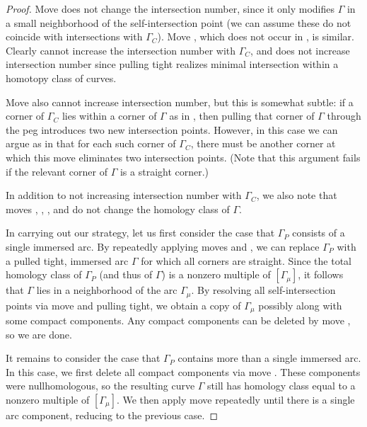 \documentclass[11pt]{amsart}
\numberwithin{equation}{section}
\numberwithin{theorem}{section}
\theoremstyle{definition}
\begin{document}
\begin{proof}
Move  does not change the intersection number, since it only modifies $\Gamma$ in a small neighborhood of the self-intersection point (we can assume these do not coincide with intersections with $\Gamma_C$). Move , which does not occur in \cite{hrw}, is similar. Clearly  cannot increase the intersection number with $\Gamma_C$, and  does not increase intersection number since pulling tight realizes minimal intersection within a homotopy class of curves.

Move  also cannot increase intersection number, but this is somewhat subtle: if a corner of $\Gamma_C$ lies within a corner of $\Gamma$ as in \cite[Figure 55(a)]{hrw}, then pulling that corner of $\Gamma$ through the peg introduces two new intersection points.  However, in this case we can argue as in \cite{hrw} that for each such corner of $\Gamma_C$, there must be another corner at which this move eliminates two intersection points. (Note that this argument fails if the relevant corner of $\Gamma$ is a straight corner.) 

In addition to not increasing intersection number with $\Gamma_C$, we also note that moves , , , and  do not change the homology class of $\Gamma$.

In carrying out our strategy, let us first consider the case that $\Gamma_P$ consists of a single immersed arc. By repeatedly applying moves  and , we can replace $\Gamma_P$ with a pulled tight, immersed arc $\Gamma$ for which all corners are straight.  Since the total homology class of $\Gamma_P$ (and thus of $\Gamma$) is a nonzero multiple of $[\Gamma_\mu]$, it follows that $\Gamma$ lies in a neighborhood of the arc $\Gamma_\mu$. By resolving all self-intersection points via move  and pulling tight, we obtain a copy of $\Gamma_\mu$ possibly along with some compact components. Any compact components can be deleted by move , so we are done.

It remains to consider the case that $\Gamma_P$ contains more than a single immersed arc. In this case, we first delete all compact components via move  . These components were  nullhomologous, so the resulting curve $\Gamma$ still has homology class equal to a nonzero multiple of $[\Gamma_\mu]$. We then apply move  repeatedly until there is a single arc component, reducing to the previous case. 
\end{proof}
\end{document}
